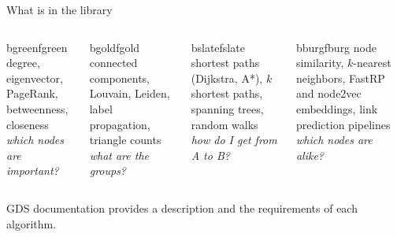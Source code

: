 \documentclass[aspectratio=169, 10pt]{beamer}
\begin{document}
\begin{frame}[fragile]{What is in the library}
  \vspace{0.2cm}
  \begin{columns}[T]
      \begin{tbox}[Centrality]{bgreen}{fgreen}
        degree, eigenvector, PageRank, betweenness, closeness\\[3pt]
        \emph{which nodes are important?}
      \end{tbox}
      \begin{tbox}{bgold}{fgold}
        connected components, Louvain, Leiden, label propagation, triangle counts\\[3pt]
        \emph{what are the groups?}
      \end{tbox}
      \begin{tbox}[Paths]{bslate}{fslate}
        shortest paths (Dijkstra, A*), $k$ shortest paths, spanning trees, random walks\\[3pt]
        \emph{how do I get from A to B?}
      \end{tbox}
      \begin{tbox}{bburg}{fburg}
        node similarity, $k$-nearest neighbors, FastRP and node2vec embeddings, link prediction pipelines\\[3pt]
        \emph{which nodes are alike?}
      \end{tbox}
  \end{columns}
  \vspace{0.6cm}
  \centering
  GDS documentation provides a description and the requirements of each algorithm.
\end{frame}
\end{document}
